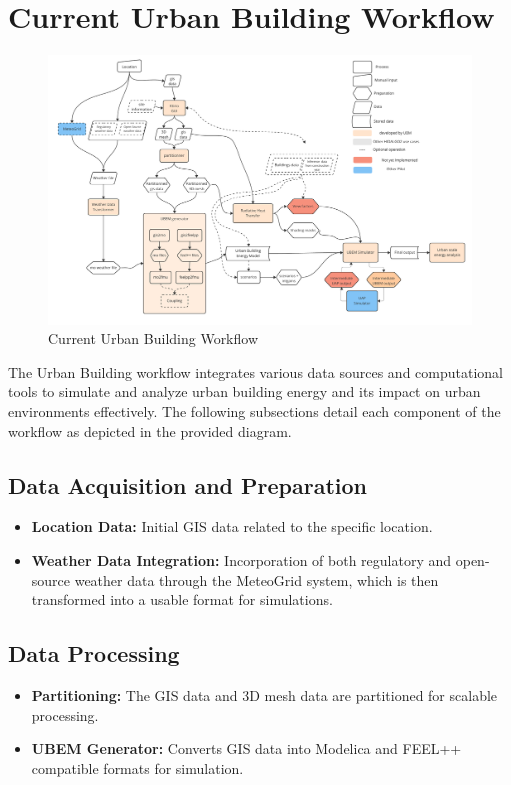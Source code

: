 \documentclass[runningheads]{llncs}
\begin{document}
\section{Current Urban Building Workflow}

\begin{figure}
    \centering
    \includegraphics[width=.9\textwidth]{kub-workflow.pdf}
    \caption{Current Urban Building Workflow}
    \label{fig:ub_workflow}
\end{figure}

The Urban Building workflow integrates various data sources and computational tools to simulate and analyze urban building energy and its impact on urban environments effectively. The following subsections detail each component of the workflow as depicted in the provided diagram.

\subsection{Data Acquisition and Preparation}
\begin{itemize}
    \item \textbf{Location Data:} Initial GIS data related to the specific location.
    \item \textbf{Weather Data Integration:} Incorporation of both regulatory and open-source weather data through the MeteoGrid system, which is then transformed into a usable format for simulations.
\end{itemize}

\subsection{Data Processing}
\begin{itemize}
    \item \textbf{Partitioning:} The GIS data and 3D mesh data are partitioned for scalable processing.
    \item \textbf{UBEM Generator:} Converts GIS data into Modelica and FEEL++ compatible formats for simulation.
\end{itemize}
\end{document}
